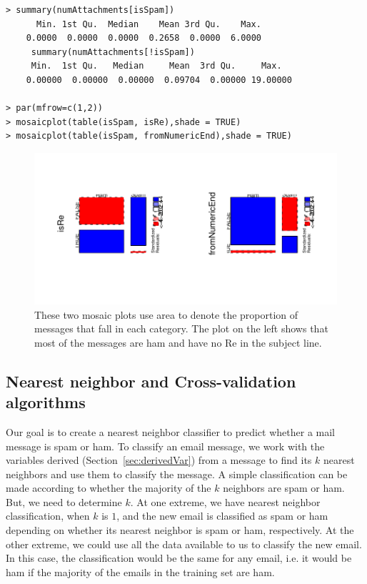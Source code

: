 \begin{verbatim}
> summary(numAttachments[isSpam])
      Min. 1st Qu.  Median    Mean 3rd Qu.    Max.
    0.0000  0.0000  0.0000  0.2658  0.0000  6.0000
     summary(numAttachments[!isSpam])
     Min.  1st Qu.   Median     Mean  3rd Qu.     Max.
    0.00000  0.00000  0.00000  0.09704  0.00000 19.00000

> par(mfrow=c(1,2))
> mosaicplot(table(isSpam, isRe),shade = TRUE)
> mosaicplot(table(isSpam, fromNumericEnd),shade = TRUE)
\end{verbatim}

\begin{figure}
\includegraphics{Spam/EDAmosaic.pdf}
\caption{These two mosaic plots use area to denote 
the proportion of messages that fall in each category.
The plot on the left shows that most of the messages
are ham and have no Re in the subject line.
}
\label{fig:mosiacRe}
\end{figure}


\subsection{Nearest neighbor and Cross-validation algorithms}
Our goal is to create a nearest neighbor classifier to predict whether
a mail message is spam or ham.  To classify an email message, we work
with the variables derived (Section~\ref{sec:derivedVar}) from a
message to find its $k$ nearest neighbors and use them to classify the
message.  A simple classification can be made according to whether the
majority of the $k$ neighbors are spam or ham.  But, we need to
determine $k$.  At one extreme, we have nearest neighbor
classification, when $k$ is $1$, and the new email is classified as
spam or ham depending on whether its nearest neighbor is spam or ham,
respectively.  At the other extreme, we could use all the data
available to us to classify the new email. In this case, the
classification would be the same for any email, i.e. it would be ham
if the majority of the emails in the training set are ham.

